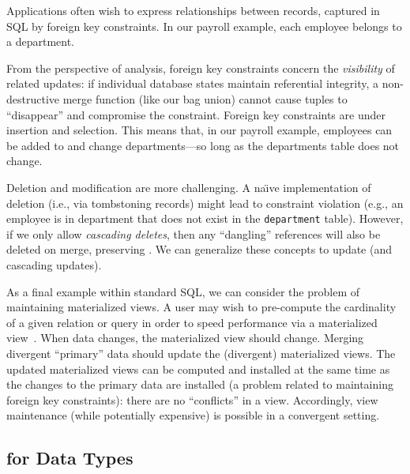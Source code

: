  Applications often wish to express
relationships between records, captured in SQL by foreign key
constraints. In our payroll example, each employee belongs to a
department.

From the perspective of \iconfluence analysis, foreign key constraints
concern the \textit{visibility} of related updates: if individual
database states maintain referential integrity, a non-destructive
merge function (like our bag union) cannot cause tuples to
``disappear'' and compromise the constraint. Foreign key constraints
are \iconfluent under insertion and selection. This means that, in our
payroll example, employees can be added to and change departments---so
long as the departments table does not change.

Deletion and modification are more challenging. A na\"{\i}ve
implementation of deletion (i.e., via tombstoning records) might lead
to constraint violation (e.g., an employee is in department that does
not exist in the \texttt{department} table). However, if we only allow
\textit{cascading deletes}, then any ``dangling'' references will also
be deleted on merge, preserving \iconfluence. We can generalize these
concepts to update (and cascading updates).

 As a final example within standard SQL,
we can consider the problem of maintaining materialized views. A user
may wish to pre-compute the cardinality of a given relation or query
in order to speed performance via a materialized
view~\cite{tamer-book}. When data changes, the materialized view
should change. Merging divergent ``primary'' data should update the
(divergent) materialized views. The updated materialized views can be
computed and installed at the same time as the changes to the primary
data are installed (a problem related to maintaining foreign key
constraints): there are no ``conflicts'' in a view. Accordingly, view
maintenance (while potentially expensive) is possible in a
convergent setting.

\subsection{\iconfluence for Data Types}

